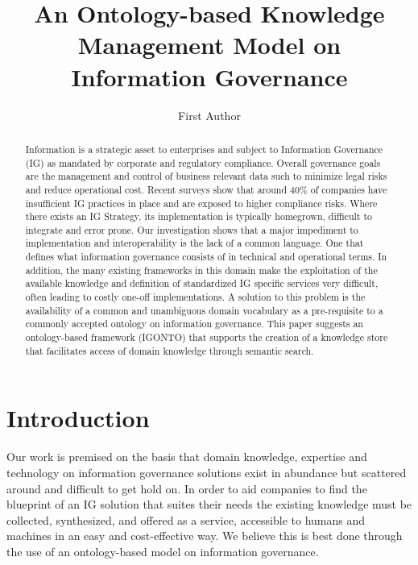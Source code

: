 \documentclass[runningheads]{llncs}
\begin{document}
%
\graphicspath{ {./figs/} }
%
\title{An Ontology-based Knowledge Management Model on Information Governance}
%
%
\author{First Author}
%
%
%
\maketitle              %
%
\begin{abstract}
Information is a strategic asset to enterprises and subject to Information Governance (IG) as mandated by corporate and regulatory compliance. Overall governance goals are the management and control of business relevant data such to minimize legal risks and reduce operational cost. Recent surveys show that around 40\% of companies have insufficient IG practices in place and are exposed to higher compliance risks. Where there exists an IG Strategy, its implementation is typically homegrown, difficult to integrate and error prone. Our investigation shows that a major impediment to implementation and interoperability is the lack of a common language. One that defines what information governance consists of in technical and operational terms. In addition, the many existing frameworks in this domain make the exploitation of the available knowledge and definition of standardized IG specific services very difficult, often leading to costly one-off implementations. A solution to this problem is the availability of a common and unambiguous domain vocabulary as a pre-requisite to a commonly accepted ontology on information governance. This paper suggests an ontology-based framework (IGONTO) that supports the creation of a knowledge store that facilitates access of domain knowledge through semantic search.

\end{abstract}
%
%
%
\section{Introduction}
Our work is premised on the basis that domain knowledge, expertise and technology on information governance solutions exist in abundance but scattered around and difficult to get hold on. In order to aid companies to find the blueprint of an IG solution that suites their needs the existing knowledge must be collected, synthesized, and offered as a service, accessible to humans and machines in an easy and cost-effective way. We believe this is best done through the use of an ontology-based model on information governance. 
\end{document}
